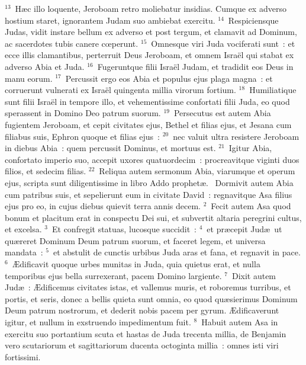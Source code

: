 ${}^{13}$~H\ae c illo loquente, Jeroboam retro moliebatur insidias. Cumque ex adverso hostium staret, ignorantem Judam suo ambiebat exercitu.
${}^{14}$~Respiciensque Judas, vidit instare bellum ex adverso et post tergum, et clamavit ad Dominum, ac sacerdotes tubis canere cœperunt.
${}^{15}$~Omnesque viri Juda vociferati sunt~: et ecce illis clamantibus, perterruit Deus Jeroboam, et omnem Isra\"el qui stabat ex adverso Abia et Juda.
${}^{16}$~Fugeruntque filii Isra\"el Judam, et tradidit eos Deus in manu eorum.
${}^{17}$~Percussit ergo eos Abia et populus ejus plaga magna~: et corruerunt vulnerati ex Isra\"el quingenta millia virorum fortium.
${}^{18}$~Humiliatique sunt filii Isra\"el in tempore illo, et vehementissime confortati filii Juda, eo quod sperassent in Domino Deo patrum suorum.
${}^{19}$~Persecutus est autem Abia fugientem Jeroboam, et cepit civitates ejus, Bethel et filias ejus, et Jesana cum filiabus suis, Ephron quoque et filias ejus~:
${}^{20}$~nec valuit ultra resistere Jeroboam in diebus Abia~: quem percussit Dominus, et mortuus est.
${}^{21}$~Igitur Abia, confortato imperio suo, accepit uxores quatuordecim~: procreavitque viginti duos filios, et sedecim filias.
${}^{22}$~Reliqua autem sermonum Abia, viarumque et operum ejus, scripta sunt diligentissime in libro Addo prophet\ae .
~Dormivit autem Abia cum patribus suis, et sepelierunt eum in civitate David~: regnavitque Asa filius ejus pro eo, in cujus diebus quievit terra annis decem.
${}^{2}$~Fecit autem Asa quod bonum et placitum erat in conspectu Dei sui, et subvertit altaria peregrini cultus, et excelsa.
${}^{3}$~Et confregit statuas, lucosque succidit~:
${}^{4}$~et pr\ae cepit Jud\ae\ ut qu\ae reret Dominum Deum patrum suorum, et faceret legem, et universa mandata~:
${}^{5}$~et abstulit de cunctis urbibus Juda aras et fana, et regnavit in pace.
${}^{6}$~\AE dificavit quoque urbes munitas in Juda, quia quietus erat, et nulla temporibus ejus bella surrexerant, pacem Domino largiente.
${}^{7}$~Dixit autem Jud\ae~: \AE dificemus civitates istas, et vallemus muris, et roboremus turribus, et portis, et seris, donec a bellis quieta sunt omnia, eo quod qu\ae sierimus Dominum Deum patrum nostrorum, et dederit nobis pacem per gyrum. \AE dificaverunt igitur, et nullum in exstruendo impedimentum fuit.
${}^{8}$~Habuit autem Asa in exercitu suo portantium scuta et hastas de Juda trecenta millia, de Benjamin vero scutariorum et sagittariorum ducenta octoginta millia~: omnes isti viri fortissimi.


